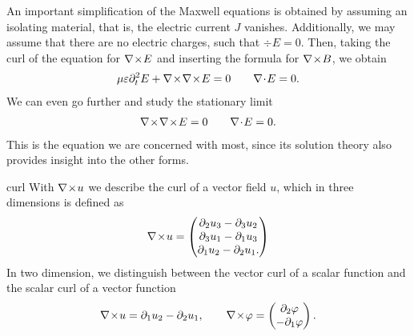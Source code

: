 \begin{intro}
  An important simplification of the Maxwell equations is obtained by
  assuming an isolating material, that is, the electric current $J$
  vanishes. Additionally, we may assume that there are no electric
  charges, such that $\div E=0$. Then, taking the curl of the equation
  for $\nabla\!\times\! E$ and inserting the formula for $\nabla\!\times\! B$, we obtain
  \begin{gather}
    \mu\varepsilon \partial_t^2 E + \nabla\!\times\!\nabla\!\times\! E = 0
    \qquad \nabla\!\cdot\! E=0.
  \end{gather}
  We can even go further and study the stationary limit
  \begin{gather}
    \label{eq:derham:1}
    \nabla\!\times\!\nabla\!\times\! E=0 \qquad \nabla\!\cdot\! E=0.
  \end{gather}
  This is the equation we are concerned with most, since its solution
  theory also provides insight into the other forms.
\end{intro}

\begin{Notation}{curl}
  With $\nabla\!\times\! u$ we describe the curl of a vector field $u$, which in
  three dimensions is defined as
  \begin{gather}
    \label{eq:derham:2}
    \nabla\!\times\! u =
    \begin{pmatrix}
      \partial_2u_3-\partial_3u_2\\\partial_3u_1-\partial_1u_3\\\partial_1u_2-\partial_2u_1.
    \end{pmatrix}
  \end{gather}
  In two dimension, we distinguish between the vector curl of a scalar
  function and the scalar curl of a vector function
  \begin{gather}
    \nabla\!\times\! u = \partial_1u_2-\partial_2u_1,
    \qquad
    \nabla\!\times\! \varphi =
    \begin{pmatrix}
      \partial_2 \varphi \\ -\partial_1\varphi
    \end{pmatrix}.
  \end{gather}
\end{Notation}

